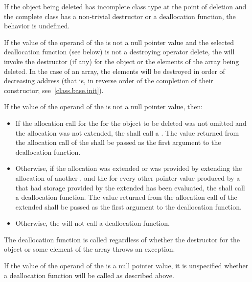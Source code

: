 \pnum
{}%
If the object being deleted has incomplete class type at the point of
deletion and the complete class has a non-trivial destructor or a
deallocation function, the behavior is undefined.

\pnum
{}%
If the value of the operand of the  is not a
null pointer value
and the selected deallocation function (see below)
is not a destroying operator delete,
the  will invoke the
destructor (if any) for the object or the elements of the array being
deleted. In the case of an array, the elements will be destroyed in
order of decreasing address (that is, in reverse order of the completion
of their constructor; see~\ref{class.base.init}).

\pnum
If the value of the operand of the  is not a
null pointer value, then:
\begin{itemize}
\item
If the allocation call for the  for the object to
be deleted was not omitted and the allocation was not extended, the
 shall call a . The value returned from the
allocation call of the  shall be passed as the
first argument to the deallocation function.

\item
Otherwise, if the allocation was extended or was provided by extending the
allocation of another , and the
 for every other pointer value produced by a
 that had storage provided by the extended
 has been evaluated, the
 shall call a deallocation function. The value
returned from the allocation call of the extended 
shall be passed as the first argument to the deallocation function.

\item
Otherwise, the  will not call a
deallocation function.
\end{itemize}
\begin{note}
The deallocation function is called regardless of whether the destructor
for the object or some element of the array throws an exception.
\end{note}
If the value of the operand of the  is a
null pointer value, it is unspecified whether a deallocation function will be
called as described above.

